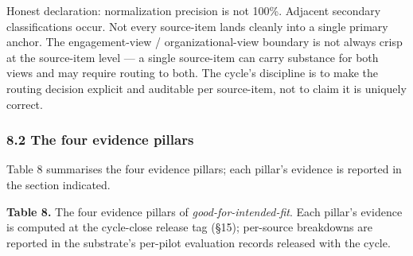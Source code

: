 \documentclass[
]{article}
\begin{document}
Honest declaration: normalization precision is not 100\%. Adjacent
secondary classifications occur. Not every source-item lands cleanly
into a single primary anchor. The engagement-view / organizational-view
boundary is not always crisp at the source-item level --- a single
source-item can carry substance for both views and may require routing
to both. The cycle's discipline is to make the routing decision explicit
and auditable per source-item, not to claim it is uniquely correct.

\subsubsection{8.2 The four evidence
pillars}\label{the-four-evidence-pillars}

Table 8 summarises the four evidence pillars; each pillar's evidence is
reported in the section indicated.

\textbf{Table 8.} The four evidence pillars of
\emph{good-for-intended-fit}. Each pillar's evidence is computed at the
cycle-close release tag (§15); per-source breakdowns are reported in the
substrate's per-pilot evaluation records released with the cycle.
\end{document}
